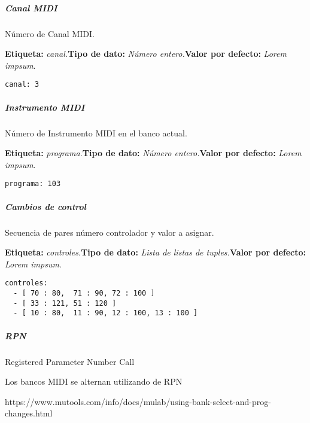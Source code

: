 \documentclass[]{article}
\let\oldsubparagraph\subparagraph
\renewcommand{\subparagraph}[1]{\oldsubparagraph{#1}\mbox{}}
\begin{document}
\hypertarget{canal-midi}{%
\subparagraph{Canal MIDI}\label{canal-midi}}

Número de Canal MIDI.

\textbf{Etiqueta:} \emph{canal.}\newline \textbf{Tipo de dato:}
\emph{Número entero.}\newline \textbf{Valor por defecto:} \emph{Lorem
impsum}.\newline

\begin{verbatim}
canal: 3
\end{verbatim}

\hypertarget{instrumento-midi}{%
\subparagraph{Instrumento MIDI}\label{instrumento-midi}}

Número de Instrumento MIDI en el banco actual.\newline

\textbf{Etiqueta:} \emph{programa.}\newline \textbf{Tipo de dato:}
\emph{Número entero.}\newline \textbf{Valor por defecto:} \emph{Lorem
impsum}.\newline

\begin{verbatim}
programa: 103
\end{verbatim}

\hypertarget{cambios-de-control}{%
\subparagraph{Cambios de control}\label{cambios-de-control}}

Secuencia de pares número controlador y valor a asignar.

\textbf{Etiqueta:} \emph{controles.}\newline \textbf{Tipo de dato:}
\emph{Lista de listas de tuples.}\newline \textbf{Valor por defecto:}
\emph{Lorem impsum}.\newline

\begin{verbatim}
controles:
  - [ 70 : 80,  71 : 90, 72 : 100 ]
  - [ 33 : 121, 51 : 120 ]
  - [ 10 : 80,  11 : 90, 12 : 100, 13 : 100 ]
\end{verbatim}

\hypertarget{rpn}{%
\subparagraph{RPN}\label{rpn}}

Registered Parameter Number Call

Los bancos MIDI se alternan utilizando de RPN

https://www.mutools.com/info/docs/mulab/using-bank-select-and-prog-changes.html
\end{document}
